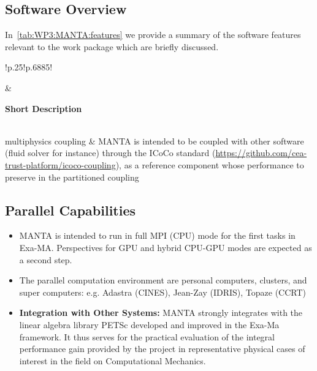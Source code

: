 \subsection{Software Overview}
\label{sec:WP3:MANTA:summary}

In~\cref{tab:WP3:MANTA:features} we provide a summary of the software features relevant to the work package which are briefly discussed.

\begin{table}[h!]
    \centering
    { 
        \setlength{\parindent}{0pt}
        \def\arraystretch{1.25}
        {
            \fontsize{9}{11}\selectfont
            \begin{tabular}{!{\color{numpexgray}\vrule}p{.25\linewidth}!{\color{numpexgray}\vrule}p{.6885\linewidth}!{\color{numpexgray}\vrule}}
    
     &  {\rule{0pt}{2.5ex}\color{white}\bf Short Description }\\ 
    
    multiphysics coupling & MANTA is intended to be coupled with other software (fluid solver for instance) through the ICoCo standard (\href{https://github.com/cea-trust-platform/icoco-coupling}{https://github.com/cea-trust-platform/icoco-coupling}), as a reference component whose performance to preserve in the partitioned coupling \\
\end{tabular}
        }
    }
    \caption{WP3: MANTA Features}
    \label{tab:WP3:MANTA:features}
\end{table}


\subsection{Parallel Capabilities}
\label{sec:WP3:MANTA:performances}


\begin{itemize}
    \item MANTA is intended to run in full MPI (CPU) mode for the first tasks in Exa-MA. Perspectives for GPU and hybrid CPU-GPU modes are expected as a second step.
    \item The parallel computation environment are personal computers, clusters, and super computers: e.g. Adastra (CINES), Jean-Zay (IDRIS), Topaze (CCRT)
    \item \textbf{Integration with Other Systems:} MANTA strongly integrates with the linear algebra library PETSc developed and improved in the Exa-Ma framework. It thus serves for the practical evaluation of the integral performance gain provided by the project in representative physical cases of interest in the field on Computational Mechanics.
\end{itemize}


